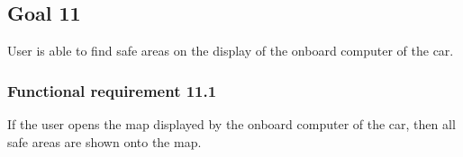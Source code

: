 \subsection{Goal 11}
User is able to find safe areas on the display of the onboard computer of the car.

\setcounter{secnumdepth}{3}
\subsubsection{Functional requirement 11.1}
If the user opens the map displayed by the onboard computer of the car, then all safe areas are shown onto the map.